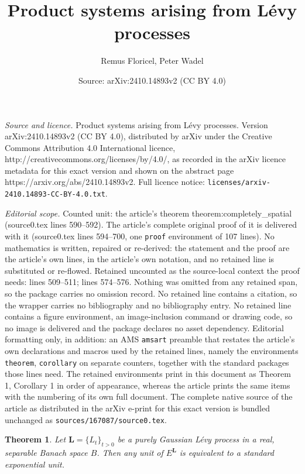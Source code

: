 \documentclass[10pt,a4paper]{amsart}
\title{Product systems arising from L\'evy processes}
\author{Remus Floricel, Peter Wadel}
\date{Source: arXiv:2410.14893v2 (CC BY 4.0)}
\newtheorem{theorem}{Theorem}
\begin{document}
\maketitle

\noindent\emph{Source and licence.} Product systems arising from L\'evy processes. Version arXiv:2410.14893v2 (CC BY 4.0), distributed by arXiv under the Creative Commons Attribution 4.0 International licence, http://creativecommons.org/licenses/by/4.0/, as recorded in the arXiv licence metadata for this exact version and shown on the abstract page https://arxiv.org/abs/2410.14893v2. Full licence notice: \texttt{licenses/arxiv-2410.14893-CC-BY-4.0.txt}.\par\smallskip

\noindent\textit{Editorial scope.} Counted unit: the article's theorem theorem:completely\_spatial (source0.tex lines 590--592). The article's complete original proof of it is delivered with it (source0.tex lines 594--700, one \texttt{proof} environment of 107 lines). No mathematics is written, repaired or re-derived: the statement and the proof are the article's own lines, in the article's own notation, and no retained line is substituted or re-flowed.  Retained uncounted as the source-local context the proof needs: lines 509--511; lines 574--576.  Nothing was omitted from any retained span, so the package carries no omission record.  No retained line contains a citation, so the wrapper carries no bibliography and no bibliography entry.  No retained line contains a figure environment, an image-inclusion command or drawing code, so no image is delivered and the package declares no asset dependency.  Editorial formatting only, in addition: an AMS \texttt{amsart} preamble that restates the article's own declarations and macros used by the retained lines, namely the environments \texttt{theorem}, \texttt{corollary} on separate counters, together with the standard packages those lines need.  The retained environments print in this document as Theorem 1, Corollary 1 in order of appearance, whereas the article prints the same items with the numbering of its own full document.  The complete native source of the article as distributed in the arXiv e-print for this exact version is bundled unchanged as \texttt{sources/167087/source0.tex}.
\begin{theorem}\label{main1}
Let \( \bm{L} = \{L_t\}_{t > 0} \) be a purely Gaussian L\'evy process in a real, separable Banach space \( B \). Then any unit of \( E^{\bm{L}} \) is equivalent to a standard exponential unit.
\end{theorem}
\end{document}
